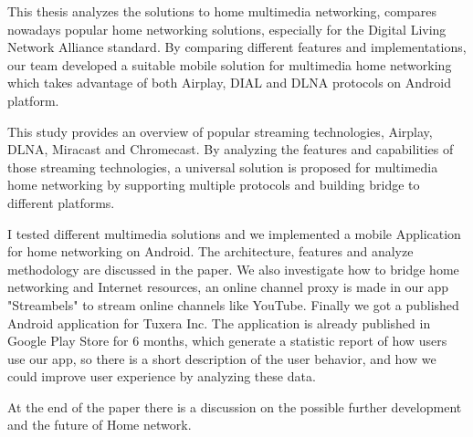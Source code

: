 This thesis analyzes the solutions to home multimedia networking, compares
nowadays popular home networking solutions, especially for the Digital Living
Network Alliance standard. By comparing different features and implementations,
our team developed a suitable mobile solution for multimedia home networking
which takes advantage of both Airplay, DIAL and DLNA protocols on Android
platform.

This study provides an overview of popular streaming technologies, Airplay,
DLNA, Miracast and Chromecast. By analyzing the features and capabilities of
those streaming technologies, a universal solution is proposed for multimedia
home networking by supporting multiple protocols and building bridge to
different platforms.

I tested different multimedia solutions and we implemented a mobile Application
for home networking on Android. The architecture, features and analyze
methodology are discussed in the paper. We also investigate how to bridge home
networking and Internet resources, an online channel proxy is made in our app
"Streambels" to stream online channels like YouTube. Finally we got a published
Android application for Tuxera Inc. The application is already published in
Google Play Store for 6 months, which generate a statistic report of how users
use our app, so there is a short description of the user behavior, and how we
could improve user experience by analyzing these data.

At the end of the paper there is a discussion on the possible further
development and the future of Home network.
